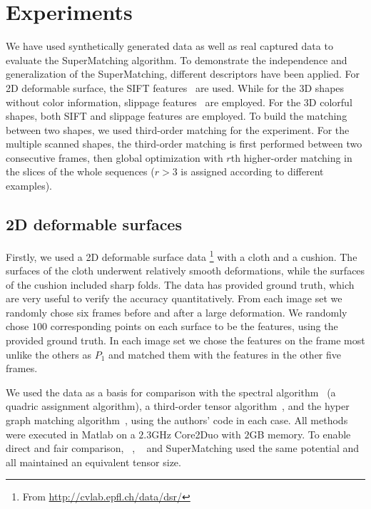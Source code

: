 \section{Experiments}
\label{sec:experiments}

We have used synthetically generated data as well as real captured data to evaluate the SuperMatching algorithm.
To demonstrate the independence and generalization of the SuperMatching, different descriptors have been applied.
For 2D deformable surface, the SIFT features~\cite{Lowe04} are used.
While for the 3D shapes without color information, slippage features~\cite{Bokeloh08} are employed.
For the 3D colorful shapes, both SIFT and slippage features are employed.
To build the matching between two shapes, we used third-order matching for the experiment.
For the multiple scanned shapes,
the third-order matching is first performed between two consecutive frames,
then global optimization with $r$th higher-order matching in the slices of the whole sequences ($r>3$ is assigned according to different examples).

\subsection{2D deformable surfaces}
\label{subsec:2DDeformable}

Firstly, we used a 2D deformable surface data \footnote{From \url{http://cvlab.epfl.ch/data/dsr/}} with a cloth and a cushion.
The surfaces of the cloth underwent relatively smooth deformations, while the surfaces of the cushion included sharp folds.
The data has provided ground truth, which are very useful to verify the accuracy quantitatively.
From each image set we randomly chose six frames before and after a large deformation.
We randomly chose $100$ corresponding points on each surface to be the features, using the provided ground truth.
In each image set we chose the features on the frame most unlike the others as $P_1$ and matched them with the features in the other five frames.

We used the data as a basis for comparison with the spectral algorithm~\cite{Cour06} (a quadric assignment algorithm),
a third-order tensor algorithm~\cite{Duchenne09},
and the hyper graph matching algorithm~\cite{Zass08}, using the authors' code in each case.
All methods were executed in Matlab on a $2.3$GHz Core2Duo with $2$GB memory.
To enable direct and fair comparison,
~\cite{Duchenne09}, ~\cite{Zass08} and SuperMatching used the same potential and all maintained an equivalent tensor size.

